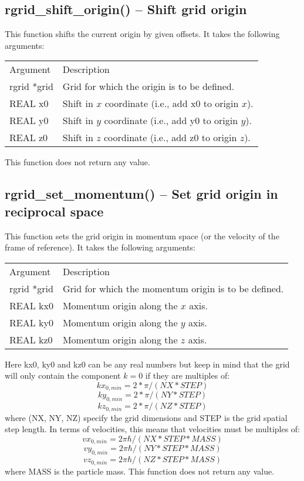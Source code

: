 \documentclass[12pt,letterpaper]{report}
\begin{document}
\subsection{rgrid\_shift\_origin() -- Shift grid origin}

This function shifts the current origin by given offsets. It takes the following arguments:
\begin{longtable}{p{} p{}}
Argument & Description\\
\cline{1-2}
rgrid *grid & Grid for which the origin is to be defined.\\
REAL x0 & Shift in $x$ coordinate (i.e., add x0 to origin $x$).\\
REAL y0 & Shift in $y$ coordinate (i.e., add y0 to origin $y$).\\
REAL z0 & Shift in $z$ coordinate (i.e., add z0 to origin $z$).\\
\end{longtable}
\noindent
This function does not return any value.

\subsection{rgrid\_set\_momentum() -- Set grid origin in reciprocal space}

This function sets the grid origin in momentum space (or the velocity of the frame of reference). It takes the following arguments:
\begin{longtable}{p{} p{}}
Argument & Description\\
\cline{1-2}
rgrid *grid & Grid for which the momentum origin is to be defined.\\
REAL kx0 & Momentum origin along the $x$ axis.\\
REAL ky0 & Momentum origin along the $y$ axis.\\
REAL kz0 & Momentum origin along the $z$ axis.\\
\end{longtable}
\noindent
Here kx0, ky0 and kz0 can be any real numbers but keep in mind that the grid will only contain the component $k = 0$ if they are multiples of:
$$kx_{0,min} = 2 * \pi / (NX * STEP)$$
$$ky_{0,min} = 2 * \pi / (NY * STEP)$$
$$kz_{0,min} = 2 * \pi / (NZ * STEP)$$
\noindent
where (NX, NY, NZ) specify the grid dimensions and STEP is the grid spatial step length. In terms of velocities, this means that velocities must be multiples of:
$$vx_{0,min} = 2\pi\hbar / (NX * STEP * MASS)$$
$$vy_{0,min} = 2\pi\hbar / (NY * STEP * MASS)$$
$$vz_{0,min} = 2\pi\hbar / (NZ * STEP * MASS)$$
where MASS is the particle mass. This function does not return any value.
\end{document}
